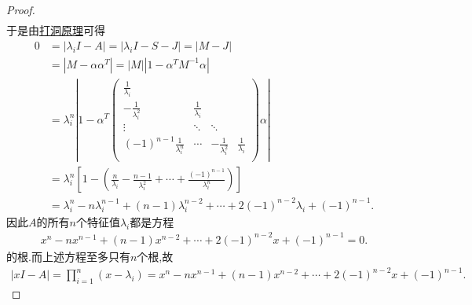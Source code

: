 \documentclass[../../main.tex]{subfiles}
\begin{document}
\begin{proof}
\begin{align*}
\end{align*}
于是由\hyperref[proposition:打洞原理]{打洞原理}可得
\begin{align*}
0&=\left| \lambda_i I-A \right|=\left| \lambda_i I-S-J \right|=\left| M-J \right|
\\
&=\left| M-\alpha \alpha ^T \right|=\left| M \right|\left| 1-\alpha ^TM^{-1}\alpha \right|
\\
&=\lambda_i ^n\left| 1-\alpha ^T\left( \begin{matrix}
\frac{1}{\lambda_i}&		&		&		\\
-\frac{1}{\lambda_i ^2}&		\frac{1}{\lambda_i}&		&		\\
\vdots&		\ddots&		\ddots&		\\
(-1)^{n-1}\frac{1}{\lambda_i ^n}&		\cdots&		-\frac{1}{\lambda_i ^2}&		\frac{1}{\lambda_i}\\
\end{matrix} \right) \alpha \right|
\\
&=\lambda_i ^n\left[ 1-\left( \frac{n}{\lambda_i}-\frac{n-1}{\lambda_i ^2}+\cdots +\frac{\left( -1 \right) ^{n-1}}{\lambda_i ^n} \right) \right] 
\\
&=\lambda_i ^n-n\lambda_i ^{n-1}+\left( n-1 \right) \lambda_i ^{n-2}+\cdots +2\left( -1 \right) ^{n-2}\lambda_i +\left( -1 \right) ^{n-1}.
\end{align*}
因此$A$的所有$n$个特征值$\lambda_i$都是方程
\begin{align*}
x^n-nx^{n-1}+\left( n-1 \right) x^{n-2}+\cdots +2\left( -1 \right) ^{n-2}x+\left( -1 \right) ^{n-1}=0.
\end{align*}
的根.而上述方程至多只有$n$个根,故
\begin{align*}
\left| xI-A \right|=\prod_{i=1}^n{\left( x-\lambda _i \right)}=x^n-nx^{n-1}+\left( n-1 \right) x^{n-2}+\cdots +2\left( -1 \right) ^{n-2}x+\left( -1 \right) ^{n-1}.
\end{align*}
\end{proof}
\end{document}
